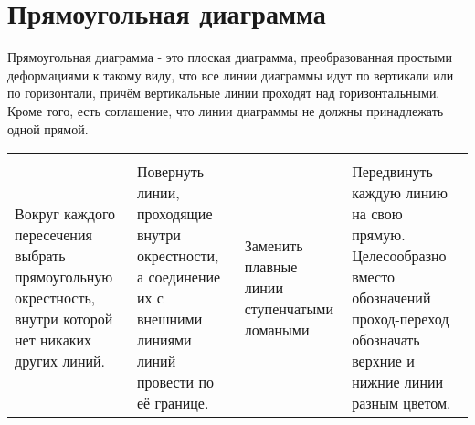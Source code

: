 \section{Прямоугольная диаграмма}
Прямоугольная диаграмма - это плоская диаграмма, преобразованная простыми деформациями к такому виду, что все линии диаграммы идут по вертикали или по горизонтали, причём вертикальные линии проходят над горизонтальными.
Кроме того, есть соглашение, что линии диаграммы не должны принадлежать одной прямой.

\begin{tabular}{
>{\centering\arraybackslash}m{3cm}
>{\centering\arraybackslash}m{3cm}
>{\centering\arraybackslash}m{3cm}
>{\centering\arraybackslash}m{3cm}
}

&

&

&

\\
Вокруг каждого пересечения выбрать прямоугольную окрестность, внутри которой нет никаких других линий.
&
Повернуть линии, проходящие внутри окрестности, а соединение их с внешними линиями линий провести по её границе.
&
Заменить плавные линии ступенчатыми ломаными
&
Передвинуть каждую линию на свою прямую.
Целесообразно вместо обозначений проход-переход обозначать верхние и нижние линии разным цветом.
\end{tabular}


